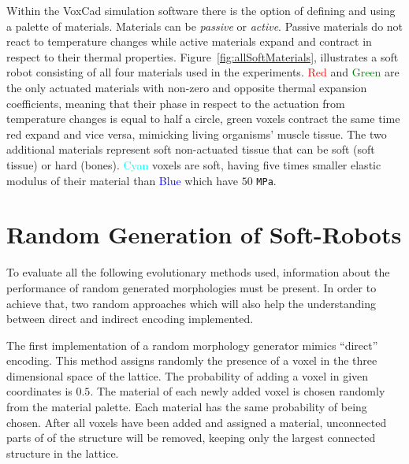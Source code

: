 Within the VoxCad simulation software there is the option of defining and using a palette of materials. Materials can be \emph{passive} or \emph{active}. Passive materials do not react to temperature changes while active materials expand and contract in respect to their thermal properties. Figure~\ref{fig:allSoftMaterials}, illustrates a soft robot consisting of all four materials used in the experiments. \textcolor{Red}{Red} and \textcolor{Green}{Green} are the only actuated materials with non-zero and opposite thermal expansion coefficients, meaning that their phase in respect to the actuation from temperature changes is equal to half a circle, green voxels contract the same time red expand and vice versa, mimicking living organisms' muscle tissue. The two additional materials represent soft non-actuated tissue that can be soft (soft tissue) or hard (bones). \textcolor{Cyan}{Cyan} voxels are soft, having five times smaller elastic modulus of their material than \textcolor{Blue}{Blue} which have $50$ \texttt{MPa}.


\section{Random Generation of Soft-Robots}

To evaluate all the following evolutionary methods used, information about the performance of random generated morphologies must be present. In order to achieve that, two random approaches which will also help the understanding between direct and indirect encoding implemented. 

The first implementation of a random morphology generator mimics ``direct'' encoding. This method assigns randomly the presence of a voxel in the three dimensional space of the lattice. The probability of adding a voxel in given coordinates is $0.5$. The material of each newly added voxel is chosen randomly from the material palette. Each material has the same probability of being chosen. After all voxels have been added and assigned a material, unconnected parts of of the structure will be removed, keeping only the largest connected structure in the lattice.


